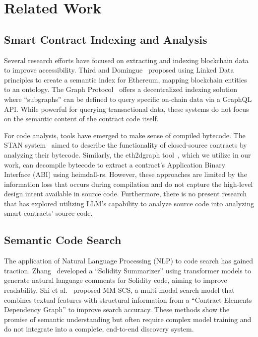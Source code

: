 \section{Related Work}\label{sec:related}

\subsection{Smart Contract Indexing and Analysis}
Several research efforts have focused on extracting and indexing blockchain data to improve accessibility. Third and Domingue~\cite{b4} proposed using Linked Data principles to create a semantic index for Ethereum, mapping blockchain entities to an ontology. The Graph Protocol~\cite{b5} offers a decentralized indexing solution where ``subgraphs'' can be defined to query specific on-chain data via a GraphQL API. While powerful for querying transactional data, these systems do not focus on the semantic content of the contract code itself.

For code analysis, tools have emerged to make sense of compiled bytecode. The STAN system~\cite{b6} aimed to describe the functionality of closed-source contracts by analyzing their bytecode. Similarly, the eth2dgraph tool~\cite{b7}, which we utilize in our work, can decompile bytecode to extract a contract's Application Binary Interface (ABI) using heimdall-rs. However, these approaches are limited by the information loss that occurs during compilation and do not capture the high-level design intent available in source code. Furthermore, there is no present research that has explored utilizing LLM's capability to analyze source code into analyzing smart contracts' source code.

\subsection{Semantic Code Search}
The application of Natural Language Processing (NLP) to code search has gained traction. Zhang~\cite{b8} developed a ``Solidity Summarizer'' using transformer models to generate natural language comments for Solidity code, aiming to improve readability. Shi et al.~\cite{b9} proposed MM-SCS, a multi-modal search model that combines textual features with structural information from a ``Contract Elements Dependency Graph'' to improve search accuracy. These methods show the promise of semantic understanding but often require complex model training and do not integrate into a complete, end-to-end discovery system.


